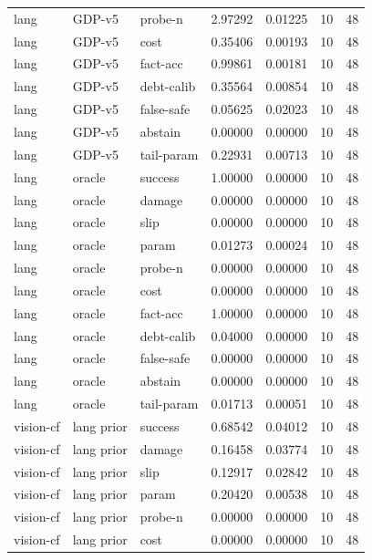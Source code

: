 \documentclass{article}
\begin{document}
\begin{center}
\begin{longtable}{lllllll}
lang & GDP-v5 & probe-n & 2.97292 & 0.01225 & 10 & 48 \\
lang & GDP-v5 & cost & 0.35406 & 0.00193 & 10 & 48 \\
lang & GDP-v5 & fact-acc & 0.99861 & 0.00181 & 10 & 48 \\
lang & GDP-v5 & debt-calib & 0.35564 & 0.00854 & 10 & 48 \\
lang & GDP-v5 & false-safe & 0.05625 & 0.02023 & 10 & 48 \\
lang & GDP-v5 & abstain & 0.00000 & 0.00000 & 10 & 48 \\
lang & GDP-v5 & tail-param & 0.22931 & 0.00713 & 10 & 48 \\
lang & oracle & success & 1.00000 & 0.00000 & 10 & 48 \\
lang & oracle & damage & 0.00000 & 0.00000 & 10 & 48 \\
lang & oracle & slip & 0.00000 & 0.00000 & 10 & 48 \\
lang & oracle & param & 0.01273 & 0.00024 & 10 & 48 \\
lang & oracle & probe-n & 0.00000 & 0.00000 & 10 & 48 \\
lang & oracle & cost & 0.00000 & 0.00000 & 10 & 48 \\
lang & oracle & fact-acc & 1.00000 & 0.00000 & 10 & 48 \\
lang & oracle & debt-calib & 0.04000 & 0.00000 & 10 & 48 \\
lang & oracle & false-safe & 0.00000 & 0.00000 & 10 & 48 \\
lang & oracle & abstain & 0.00000 & 0.00000 & 10 & 48 \\
lang & oracle & tail-param & 0.01713 & 0.00051 & 10 & 48 \\
vision-cf & lang prior & success & 0.68542 & 0.04012 & 10 & 48 \\
vision-cf & lang prior & damage & 0.16458 & 0.03774 & 10 & 48 \\
vision-cf & lang prior & slip & 0.12917 & 0.02842 & 10 & 48 \\
vision-cf & lang prior & param & 0.20420 & 0.00538 & 10 & 48 \\
vision-cf & lang prior & probe-n & 0.00000 & 0.00000 & 10 & 48 \\
vision-cf & lang prior & cost & 0.00000 & 0.00000 & 10 & 48 \\
\bottomrule
\end{longtable}
\renewcommand{\arraystretch}{1.0}
\end{center}
\end{document}
